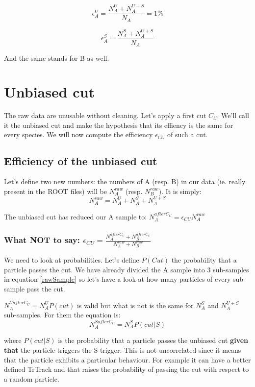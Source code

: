 \documentclass[11pt]{article}
\begin{document}
\[
\epsilon_{A}^{U} = \frac{N_{A}^{U} + N_{A}^{U+S}}{N_{A}} = 1 \%
\]

\[
  \epsilon_{A}^{S} = \frac{N_{A}^{S} + N_{A}^{U+S}}{N_{A}}
\]

And the same stands for B as well.
\section{Unbiased cut}
\label{sec-2}

The raw data are unusable without cleaning. Let's apply a first cut $C_{U}$. We'll call it the unbiased cut and make the hypothesis that its effiency is the same for every species. We will now compute the efficiency $\epsilon_{CU}$ of such a cut.
\subsection{Efficiency of the unbiased cut}
\label{sec-2-1}

Let's define two new numbers: the numbers of A (resp. B) in our data (ie. really present in the ROOT files) will be $N_{A}^{raw}$ (resp. $N_{B}^{raw}$). It is simply:
\[
  \label{rawSample}
  N_{A}^{raw} = N_{A}^{U} + N_{A}^{S} + N_{A}^{U+S}
\]

The unbiased cut has reduced our A sample to:
$N_{A}^{after C_{U}} = \epsilon_{CU} N_{A}^{raw}$
\subsubsection{What NOT to say: $\epsilon_{CU} = \frac{N_{A}^{after C_{U}} + N_{B}^{after C_{U}}}{N_{A}^{raw} + N_{B}^{raw}}$}
\label{sec-2-1-1}


We need to look at probabilities. Let's define $P(Cut)$ the probability that a particle passes the cut.
We have already divided the A sample into 3 sub-samples in equation \ref{rawSample} so let's have a look at how many particles of every sub-sample pass the cut.

$N_{A}^{U after C_{U}} = N_{A}^{U} P(cut)$ is valid but what is not is the same for $N_{A}^{S}$ and $N_{A}^{U+S}$ sub-samples.
For them the equation is:
\[
  N_{A}^{S after C_{U}} = N_{A}^{S} P(cut|S)
\]

where $P(cut|S)$ is the probability that a particle passes the unbiased cut \textbf{given that} the particle triggers the S trigger. This is not uncorrelated since it means that the particle exhibits a particular behaviour.
For example it can have a better defined TrTrack and that raises the probability of passing the cut with respect to a random particle.
\end{document}
